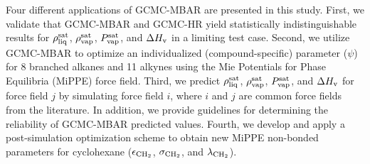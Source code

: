 \documentclass[journal=jced,manuscript=article]{achemso}
\begin{document}
Four different applications of GCMC-MBAR are presented in this study. First, we validate that GCMC-MBAR and GCMC-HR yield statistically indistinguishable results for $\rho_{\rm liq}^{\rm sat}$, $\rho_{\rm vap}^{\rm sat}$, $P_{\rm vap}^{\rm sat}$, and $\Delta H_{\rm v}$ in a limiting test case. Second, we utilize GCMC-MBAR to optimize an individualized (compound-specific) parameter ($\psi$) for 8 branched alkanes and 11 alkynes using the Mie Potentials for Phase Equilibria (MiPPE) force field. Third, we predict $\rho_{\rm liq}^{\rm sat}$, $\rho_{\rm vap}^{\rm sat}$, $P_{\rm vap}^{\rm sat}$, and $\Delta H_{\rm v}$ for force field $j$ by simulating force field $i$, where $i$ and $j$ are common force fields from the literature. In addition, we provide guidelines for determining the reliability of GCMC-MBAR predicted values. Fourth, we develop and apply a post-simulation optimization scheme to obtain new MiPPE non-bonded parameters for cyclohexane ($\epsilon_{\rm CH_2}$, $\sigma_{\rm CH_2}$, and $\lambda_{\rm CH_2}$).


\end{document}
